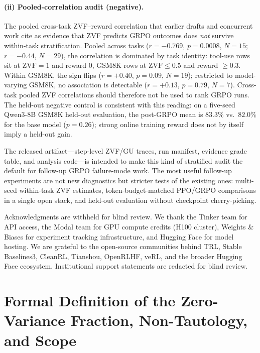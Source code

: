 \documentclass{article}
\begin{document}
\paragraph{(ii) Pooled-correlation audit (negative).}
The pooled cross-task ZVF--reward correlation that earlier drafts and
concurrent work cite as evidence that ZVF predicts GRPO outcomes does
\emph{not} survive within-task stratification. Pooled across tasks
($r{=}-0.769$, $p{=}0.0008$, $N{=}15$; $r{=}-0.44$, $N{=}29$), the
correlation is dominated by task identity: tool-use rows sit at
$\mathrm{ZVF}{=}1$ and reward $0$, GSM8K rows at $\mathrm{ZVF}{\le}0.5$ and
reward $\geq 0.3$. Within GSM8K, the sign flips ($r{=}+0.40$, $p{=}0.09$,
$N{=}19$); restricted to model-varying GSM8K, no association is detectable
($r{=}+0.13$, $p{=}0.79$, $N{=}7$). Cross-task pooled ZVF correlations
should therefore not be used to rank GRPO runs. The held-out negative
control is consistent with this reading: on a five-seed Qwen3-8B GSM8K
held-out evaluation, the post-GRPO mean is $83.3\%$ vs.\ $82.0\%$ for the
base model ($p{=}0.26$); strong online training reward does not by itself
imply a held-out gain.

The released artifact---step-level ZVF/GU traces, run manifest, evidence
grade table, and analysis code---is intended to make this kind of stratified
audit the default for follow-up GRPO failure-mode work. The most useful
follow-up experiments are not new diagnostics but stricter tests of the
existing ones: multi-seed within-task ZVF estimates, token-budget-matched
PPO/GRPO comparisons in a single open stack, and held-out evaluation
without checkpoint cherry-picking.
 
\label{sec:acknowledgments}
\begin{ack}
Acknowledgments are withheld for blind review. We thank the Tinker team for
API access, the Modal team for GPU compute credits (H100 cluster), Weights
\& Biases for experiment tracking infrastructure, and Hugging Face for model
hosting. We are grateful to the open-source communities behind TRL, Stable
Baselines3, CleanRL, Tianshou, OpenRLHF, veRL, and the broader Hugging Face
ecosystem. Institutional support statements are redacted for blind review.
\end{ack}






\appendix


\section{Formal Definition of the Zero-Variance Fraction, Non-Tautology, and Scope}
\label{sec:appendix:zvf-formalization}
\end{document}
